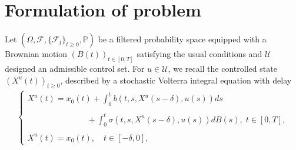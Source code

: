 \documentclass[12pt]{article}
\theoremstyle{remark}
\numberwithin{equation}{section}
\begin{document}
\section{Formulation of problem}
Let $\left( \Omega, \mathcal{F}, \{ \mathcal{F}_t \}_{t \ge 0}, \mathbb{P} \right)$ be a filtered probability space equipped with a Brownian motion $(B(t))_{t \in [0, T]}$ satisfying the usual conditions and $\mathcal{U}$ designed an admissible control set.
For $u\in \mathcal{U}$, we recall the controlled state $(X^{u}(t))_{t\geq 0}$, described by a stochastic Volterra integral equation with delay
\begin{eqnarray}\label{A1}
\left\{
\begin{array}{l}
\displaystyle X^{u}(t)= x_{0}(t)+ \int_{0}^{t}b(t,s,X^{u}(s-\delta),u(s)) ds\\\\\;\;\;\;\;\;\;\;\;\;\;\;\;\;\;\;\;\;\;\;\;\;\;\;\;\; +\displaystyle\int_{0}^{t} \sigma(t,s,X^{u}(s-\delta),u(s))dB(s), \; 	t \in [0,T],\\\\
X^{u}(t) = x_{0}(t), \quad t \in [-\delta, 0],
\end{array}\right.
\end{eqnarray}
\end{document}
